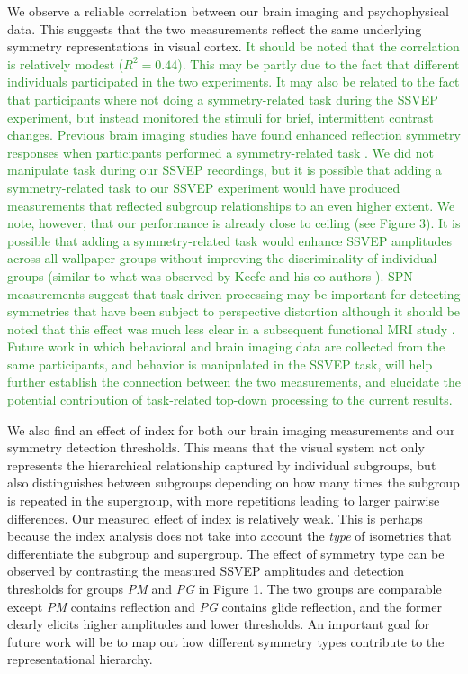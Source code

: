 \documentclass[11pt, twoside]{article}
\begin{document}
We observe a reliable correlation between our brain imaging and psychophysical data. This suggests that the two measurements reflect the same underlying symmetry representations in visual cortex. \textcolor{ForestGreen}{It should be noted that the correlation is relatively modest ($R^2 = 0.44$). This may be partly due to the fact that different individuals participated in the two experiments. It may also be related to the fact that participants where not doing a symmetry-related task during the SSVEP experiment, but instead monitored the stimuli for brief, intermittent contrast changes. Previous brain imaging studies have found enhanced reflection symmetry responses when participants performed a symmetry-related task \cite{makin_formation_2020, Sasaki_2005, keefe_2018}. We did not manipulate task during our SSVEP recordings, but it is possible that adding a symmetry-related task to our SSVEP experiment would have produced measurements that reflected subgroup relationships to an even higher extent. We note, however, that our performance is already close to ceiling (see Figure 3). It is possible that adding a symmetry-related task would enhance SSVEP amplitudes across all wallpaper groups without improving the discriminality of individual groups (similar to what was observed by Keefe and his co-authors \cite{keefe_2018}). SPN measurements suggest that task-driven processing may be important for detecting symmetries that have been subject to perspective distortion \cite{makin_conditions_2015} although it should be noted that this effect was much less clear in a subsequent functional MRI study \cite{keefe_2018}. Future work in which behavioral and brain imaging data are collected from the same participants, and behavior is manipulated in the SSVEP task, will help further establish the connection between the two measurements, and elucidate the potential contribution of task-related top-down processing to the current results.}

We also find an effect of index for both our brain imaging measurements and our symmetry detection thresholds. This means that the visual system not only represents the hierarchical relationship captured by individual subgroups, but also distinguishes between subgroups depending on how many times the subgroup is repeated in the supergroup, with more repetitions leading to larger pairwise differences. Our measured effect of index is relatively weak. This is perhaps because the index analysis does not take into account the \textit{type} of isometries that differentiate the subgroup and supergroup. The effect of symmetry type can be observed by contrasting the measured SSVEP amplitudes and detection thresholds for groups \textit{PM} and \textit{PG} in Figure 1. The two groups are comparable except \textit{PM} contains reflection and \textit{PG} contains glide reflection, and the former clearly elicits higher amplitudes and lower thresholds. An important goal for future work will be to map out how different symmetry types contribute to the representational hierarchy. 
\end{document}
